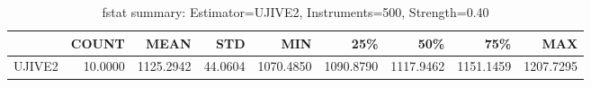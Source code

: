 \begin{table}[ht]
\centering
\caption{fstat summary: Estimator=UJIVE2, Instruments=500, Strength=0.40}
\begin{tabular}{lrrrrrrrr}
\toprule
 & COUNT & MEAN & STD & MIN & 25\% & 50\% & 75\% & MAX \\
\midrule
UJIVE2 & 10.0000 & 1125.2942 & 44.0604 & 1070.4850 & 1090.8790 & 1117.9462 & 1151.1459 & 1207.7295 \\
\bottomrule
\end{tabular}
\end{table}
